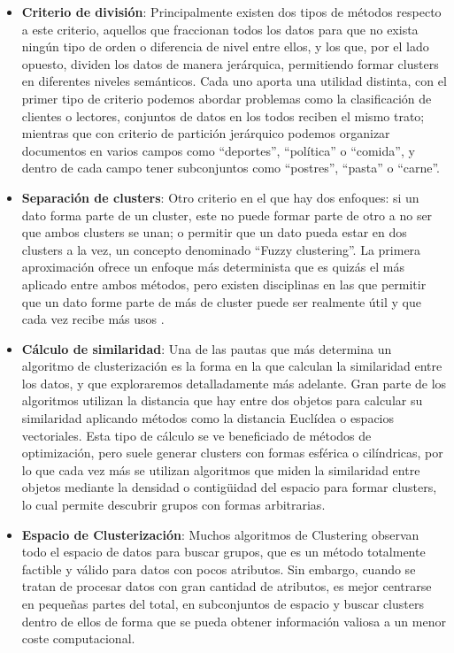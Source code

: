 \documentclass[3p,twocolumn]{elsarticle}
\begin{document}
\begin{itemize}
  \item \textbf{Criterio de división}: Principalmente existen dos tipos de métodos respecto a este criterio, aquellos que fraccionan todos los datos para que no exista ningún tipo de orden o diferencia de nivel entre ellos, y los que, por el lado opuesto, dividen los datos de manera jerárquica, permitiendo formar clusters en diferentes niveles semánticos. Cada uno aporta una utilidad distinta, con el primer tipo de criterio podemos abordar problemas como la clasificación de clientes o lectores, conjuntos de datos en los todos reciben el mismo trato; mientras que con criterio de partición jerárquico podemos organizar documentos en varios campos como ``deportes'', ``política'' o ``comida'', y dentro de cada campo tener subconjuntos como ``postres'', ``pasta'' o ``carne''.
  
  \item \textbf{Separación de clusters}: Otro criterio en el que hay dos enfoques: si un dato forma parte de un cluster, este no puede formar parte de otro a no ser que ambos clusters se unan; o permitir que un dato pueda estar en dos clusters a la vez, un concepto denominado ``Fuzzy clustering''. La primera aproximación ofrece un enfoque más determinista que es quizás el más aplicado entre ambos métodos, pero existen disciplinas en las que permitir que un dato forme parte de más de cluster puede ser realmente útil y que cada vez recibe más usos \cite{17}.  
  
  \item \textbf{Cálculo de similaridad}: Una de las pautas que más determina un algoritmo de clusterización es la forma en la que calculan la similaridad entre los datos, y que exploraremos detalladamente más adelante. Gran parte de los algoritmos utilizan la distancia que hay entre dos objetos para calcular su similaridad aplicando métodos como la distancia Euclídea o espacios vectoriales. Esta tipo de cálculo se ve beneficiado de métodos de optimización, pero suele generar clusters con formas esférica o cilíndricas, por lo que cada vez más se utilizan algoritmos que miden la similaridad entre objetos mediante la densidad o contigüidad del espacio para formar clusters, lo cual permite descubrir grupos con formas arbitrarias.  
  
  \item \textbf{Espacio de Clusterización}: Muchos algoritmos de Clustering observan todo el espacio de datos para buscar grupos, que es un método totalmente factible y válido para datos con pocos atributos. Sin embargo, cuando se tratan de procesar datos con gran cantidad de atributos, es mejor centrarse en pequeñas partes del total, en subconjuntos de espacio y buscar clusters dentro de ellos de forma que se pueda obtener información valiosa a un menor coste computacional.
\end{itemize}
\end{document}
